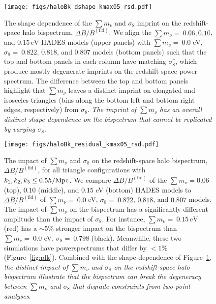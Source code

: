 \documentclass[12pt, letterpaper, preprint]{aastex62}
\newcommand{\smnu}{\sum m_\nu}
\newcommand{\sig}{\sigma_8}
\begin{document}
\begin{figure}
\begin{center}
\texttt{[image: figs/haloBk\_dshape\_kmax05\_rsd.pdf]} 
    \caption{The shape dependence of the $\smnu$ and $\sig$ imprint on 
    the redshift-space halo bispectrum, $\Delta B/B^\mathrm{(fid)}$. 
    We align the $\smnu{=}~0.06, 0.10$, and $0.15\,\mathrm{eV}$ HADES models 
    (upper panels) with $\smnu{=}~0.0$ eV, $\sig{=}~0.822$, $0.818$, and $0.807$ 
    models (bottom panels) such that the top and bottom panels in each column 
    have matching $\sig^{c}$, which produce mostly degenerate imprints on the 
    redshift-space power spectrum. The difference between the top and bottom 
    panels highlight that $\smnu$ leaves a distinct imprint on elongated and 
    isosceles triangles (bins along the bottom left and bottom right edges, 
    respectively) from $\sig$. {\em The imprint of $\smnu$ has an overall distinct 
    shape dependence on the bispectrum that cannot be replicated by varying $\sig$}. 
    }
\label{fig:dbk_shape}
\end{center}
\end{figure}

\begin{figure}
\begin{center}
\texttt{[image: figs/haloBk\_residual\_kmax05\_rsd.pdf]}
    \caption{The impact of $\smnu$ and $\sig$ on the redshift-space 
    halo bispectrum, $\Delta B/B^\mathrm{(fid)}$, for all triangle configurations 
    with $k_1, k_2, k_3 \leq 0.5 h/{\rm Mpc}$. We compare $\Delta B/B^\mathrm{(fid)}$ 
    of the $\smnu = 0.06$ (top), $0.10$ (middle), and $0.15$ eV (bottom) HADES models
    to $\Delta B/B^\mathrm{(fid)}$ of $\smnu{=}~0.0$ eV, $\sig{=}~0.822$, $0.818$, and 
    $0.807$ models. The impact of $\smnu$ on the bispectrum has a significantly different 
    amplitude than the impact of $\sig$. For instance, $\smnu{=}~0.15\,\mathrm{eV}$ (red) 
    has a $\sim 5\%$ stronger impact on the bispectrum than $\smnu{=}~0.0$ eV, 
    $\sig{=}~0.798$ (black). Meanwhile, these two simulations have powerspectrums that 
    differ by $< 1\%$ (Figure~\ref{fig:plk}). Combined with the shape-dependence of 
    Figure~\ref{fig:dbk_shape}, {\em the distinct impact of $\smnu$ and $\sig$ on the 
    redshift-space halo bispectrum illustrate that the bispectrum can break the degeneracy 
    between $\smnu$ and $\sig$ that degrade constraints from two-point analyses}.
    }
\label{fig:dbk_amp}
\end{center}
\end{figure}
\end{document}
